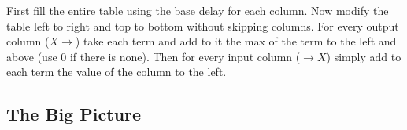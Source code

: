 \begin{scriptsize}
  First fill the entire table using the base delay for each column. Now
  modify the table left to right and top to bottom without skipping
  columns. For every output column ($X\to$) take each term and add to it
  the max of the term to the left and above (use 0 if there is none).
  Then for every input column ($\to X$) simply add to each term the
  value of the column to the left.
\end{scriptsize}
\subsection{The Big Picture}
\begin{center}
\end{center}